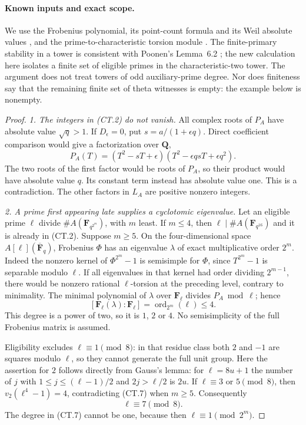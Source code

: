 \paragraph{Known inputs and exact scope.}
We use the Frobenius polynomial, its point-count formula and its
Weil absolute values \cite[Proposition~12.9 and Theorem~19.1]{MilneAV}, and the
prime-to-characteristic torsion module
\cite[Theorem~8.2 and Remark~8.4]{MilneAV}.
The finite-primary stability in a tower is consistent with
Poonen's Lemma~6.2 \cite{Poonen2005}; the new calculation here
isolates a finite set of eligible primes in the characteristic-two
tower. The argument does not treat towers of odd auxiliary-prime
degree. Nor does finiteness say that the remaining finite set of
theta witnesses is empty: the example below is nonempty.

\begin{proof}
\emph{1. The integers in (CT.2) do not vanish.}
All complex roots of $P_A$ have absolute value $\sqrt q>1$.
If $D_\epsilon=0$, put $s=a/(1+\epsilon q)$. Direct coefficient
comparison would give a factorization over $\mathbf Q$,
\[
 P_A(T)=(T^2-sT+\epsilon)
                 (T^2-\epsilon qsT+\epsilon q^2).
 \tag{CT.6}
\]
The two roots of the first factor would be roots of $P_A$,
so their product would have absolute value $q$. Its constant
term instead has absolute value one. This is a contradiction.
The other factors in $L_A$ are positive nonzero integers.

\emph{2. A prime first appearing late supplies a cyclotomic eigenvalue.}
Let an eligible prime $\ell$ divide $\#A(\mathbf F_{q^{2^m}})$,
with $m$ least. If $m\le4$, then
$\ell\mid\#A(\mathbf F_{q^{16}})$ and it is already in (CT.2).
Suppose $m\ge5$. On the four-dimensional space
$A[\ell](\overline{\mathbf F}_q)$, Frobenius $\Phi$ has an
eigenvalue $\lambda$ of exact multiplicative order $2^m$.
Indeed the nonzero kernel of $\Phi^{2^m}-1$ is semisimple for
$\Phi$, since $T^{2^m}-1$ is separable modulo $\ell$.
If all eigenvalues in that kernel had order dividing $2^{m-1}$,
there would be nonzero rational $\ell$-torsion at the preceding
level, contrary to minimality. The minimal polynomial of
$\lambda$ over $\mathbf F_\ell$ divides $P_A\bmod\ell$; hence
\[
       [\mathbf F_\ell(\lambda):\mathbf F_\ell]
               =\operatorname{ord}_{2^m}(\ell)\le4.
 \tag{CT.7}
\]
This degree is a power of two, so it is $1$, $2$ or $4$.
No semisimplicity of the full Frobenius matrix is assumed.

Eligibility excludes $\ell\equiv1\pmod8$: in that residue class
both $2$ and $-1$ are squares modulo $\ell$, so they cannot
generate the full unit group. Here the assertion for $2$ follows
directly from Gauss's lemma: for $\ell=8u+1$ the number of
$j$ with $1\le j\le(\ell-1)/2$ and $2j>\ell/2$ is $2u$.
If $\ell\equiv3$ or $5\pmod8$, then
$v_2(\ell^4-1)=4$, contradicting (CT.7) when $m\ge5$.
Consequently
\[
                              \ell\equiv7\pmod8.
 \tag{CT.8}
\]
The degree in (CT.7) cannot be one, because then
$\ell\equiv1\pmod{2^m}$.


\end{proof}
